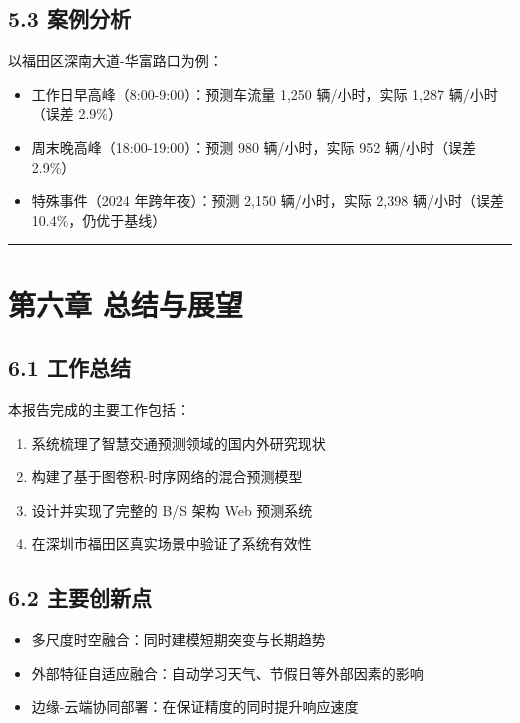 \documentclass{harryopo-report}
\begin{document}
\section*{5.3 案例分析}

以福田区深南大道-华富路口为例：

\begin{itemize}
  \item {\fzht 工作日早高峰}（8:00-9:00）：预测车流量 1,250 辆/小时，实际 1,287 辆/小时（误差 2.9\%）
  \item {\fzht 周末晚高峰}（18:00-19:00）：预测 980 辆/小时，实际 952 辆/小时（误差 2.9\%）
  \item {\fzht 特殊事件}（2024 年跨年夜）：预测 2,150 辆/小时，实际 2,398 辆/小时（误差 10.4\%，仍优于基线）
\end{itemize}

\medskip\hrule\medskip

\chapter*{第六章 总结与展望}

\section*{6.1 工作总结}

本报告完成的主要工作包括：

\begin{enumerate}
  \item 系统梳理了智慧交通预测领域的国内外研究现状
  \item 构建了基于图卷积-时序网络的混合预测模型
  \item 设计并实现了完整的 B/S 架构 Web 预测系统
  \item 在深圳市福田区真实场景中验证了系统有效性
\end{enumerate}

\section*{6.2 主要创新点}

\begin{itemize}
  \item {\fzht 多尺度时空融合}：同时建模短期突变与长期趋势
  \item {\fzht 外部特征自适应融合}：自动学习天气、节假日等外部因素的影响
  \item {\fzht 边缘-云端协同部署}：在保证精度的同时提升响应速度
\end{itemize}
\end{document}
